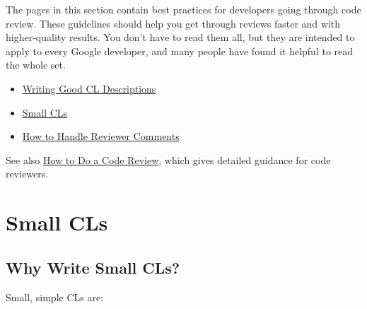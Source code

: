 \documentclass[
]{article}
\providecommand{\tightlist}{%
  \setlength{\itemsep}{0pt}\setlength{\parskip}{0pt}}
\begin{document}
The pages in this section contain best practices for developers going
through code review. These guidelines should help you get through
reviews faster and with higher-quality results. You don't have to read
them all, but they are intended to apply to every Google developer, and
many people have found it helpful to read the whole set.

\begin{itemize}
\tightlist
\item
  \href{cl-descriptions.md}{Writing Good CL Descriptions}
\item
  \href{small-cls.md}{Small CLs}
\item
  \href{handling-comments.md}{How to Handle Reviewer Comments}
\end{itemize}

See also \href{../reviewer/index.md}{How to Do a Code Review}, which
gives detailed guidance for code reviewers.

\section{Small CLs}\label{small-cls}

\subsection{Why Write Small CLs?}\label{why}

Small, simple CLs are:
\end{document}
